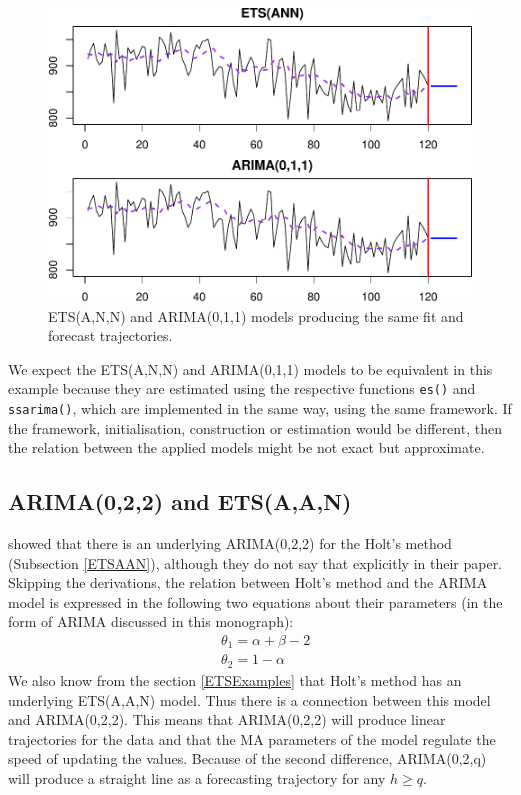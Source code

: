 \documentclass[]{book}
\theoremstyle{definition}
\theoremstyle{definition}
\theoremstyle{definition}
\theoremstyle{definition}
\theoremstyle{remark}
\begin{document}
\begin{figure}
\centering
\includegraphics{Svetunkov--2022----ADAM_files/figure-latex/ETSARIMAConnection-1.pdf}
\caption{\label{fig:ETSARIMAConnection}ETS(A,N,N) and ARIMA(0,1,1) models producing the same fit and forecast trajectories.}
\end{figure}

We expect the ETS(A,N,N) and ARIMA(0,1,1) models to be equivalent in this example because they are estimated using the respective functions \texttt{es()} and \texttt{ssarima()}, which are implemented in the same way, using the same framework. If the framework, initialisation, construction or estimation would be different, then the relation between the applied models might be not exact but approximate.

\hypertarget{ARIMAETS022}{%
\subsection{ARIMA(0,2,2) and ETS(A,A,N)}\label{ARIMAETS022}}

\citet{Nerlove1964} showed that there is an underlying ARIMA(0,2,2) for the Holt's method (Subsection \ref{ETSAAN}), although they do not say that explicitly in their paper. Skipping the derivations, the relation between Holt's method and the ARIMA model is expressed in the following two equations about their parameters (in the form of ARIMA discussed in this monograph):
\begin{equation*}
  \begin{aligned}
    &\theta_1 = \alpha + \beta -2 \\
    &\theta_2 = 1 -\alpha
  \end{aligned}
\end{equation*}
We also know from the section \ref{ETSExamples} that Holt's method has an underlying ETS(A,A,N) model. Thus there is a connection between this model and ARIMA(0,2,2). This means that ARIMA(0,2,2) will produce linear trajectories for the data and that the MA parameters of the model regulate the speed of updating the values. Because of the second difference, ARIMA(0,2,q) will produce a straight line as a forecasting trajectory for any \(h\geq q\).
\end{document}
